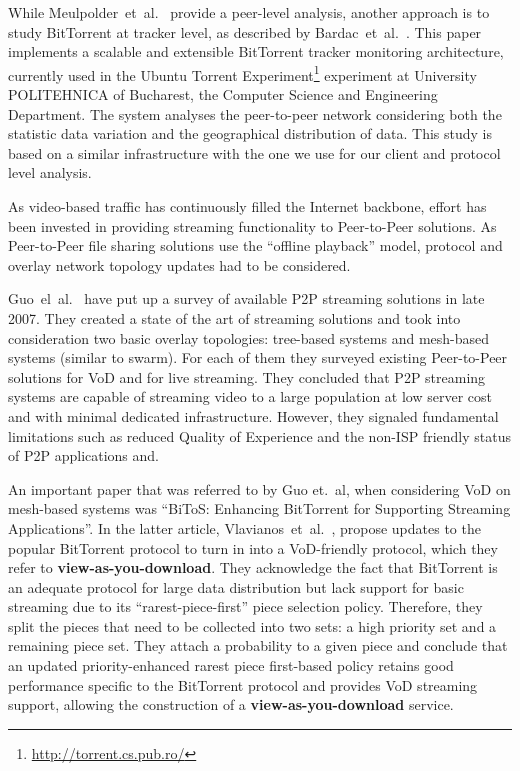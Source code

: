 While Meulpolder~et~al.~\cite{p2p09} provide a peer-level analysis, another
approach is to study BitTorrent at tracker level, as described by
Bardac~et~al.~\cite{tracker-mon}. This paper implements a scalable and
extensible BitTorrent tracker monitoring architecture, currently used in the
Ubuntu Torrent Experiment\footnote{\url{http://torrent.cs.pub.ro/}} experiment at
University POLITEHNICA of Bucharest, the Computer Science and Engineering
Department. The system analyses the peer-to-peer network considering both the
statistic data variation and the geographical distribution of data. This study
is based on a similar infrastructure with the one we use for our client and
protocol level analysis.

As video-based traffic has continuously filled the Internet backbone, effort
has been invested in providing streaming functionality to Peer-to-Peer
solutions.  As Peer-to-Peer file sharing solutions use the ``offline
playback'' model, protocol and overlay network topology updates had to be
considered.

Guo~el~al.~\cite{p2p-streaming-survey} have put up a survey of available P2P
streaming solutions in late 2007. They created a state of the art of streaming
solutions and took into consideration two basic overlay topologies: tree-based
systems and mesh-based systems (similar to swarm). For each of them they
surveyed existing Peer-to-Peer solutions for VoD and for live streaming. They
concluded that P2P streaming systems are capable of streaming video to a large
population at low server cost and with minimal dedicated infrastructure.
However, they signaled fundamental limitations such as reduced Quality of
Experience and the non-ISP friendly status of P2P applications and.

An important paper that was referred to by Guo et.~al, when considering VoD on
mesh-based systems was ``BiToS: Enhancing BitTorrent for Supporting Streaming
Applications''. In the latter article, Vlavianos~et~al.~\cite{bitos}, propose
updates to the popular BitTorrent protocol to turn in into a VoD-friendly
protocol, which they refer to \textbf{view-as-you-download}. They acknowledge
the fact that BitTorrent is an adequate protocol for large data distribution
but lack support for basic streaming due to its ``rarest-piece-first'' piece
selection policy. Therefore, they split the pieces that need to be collected
into two sets: a high priority set and a remaining piece set. They attach a
probability to a given piece and conclude that an updated priority-enhanced
rarest piece first-based policy retains good performance specific to the
BitTorrent protocol and provides VoD streaming support, allowing the
construction of a \textbf{view-as-you-download} service.

